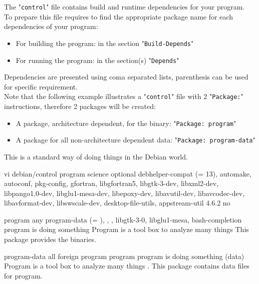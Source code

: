 The "\texttt{control}" file contains build and runtime dependencies for your program. \\
To prepare this file requires to find the appropriate package name for each dependencies of your program: 
\begin{itemize}
\item For building the program: in the section "\texttt{Build-Depends}"
\item For running the program: in the section(s) "\texttt{Depends}" 
\end{itemize}
Dependencies are presented using coma separated lists, parenthesis can be used for specific requirement. \\
Note that the following example illustrates a "\texttt{control}" file with 2 "\texttt{Package:}" instructions, therefore 2 packages will be created:
\begin{itemize}
\item A package, architecture dependent, for the binary: "\texttt{Package: program}"
\item A package for all non-architecture dependent data: "\texttt{Package: program-data}" 
\end{itemize}
This is a standard way of doing things in the Debian world. \\
{\footnotesize{
\begin{script}
 vi debian/control
 program
 science
 optional
 
 
 debhelper-compat (= 13),
                  automake,
                  autoconf,
                  pkg-config,
                  gfortran,
                  libgfortran5,
                  libgtk-3-dev,
                  libxml2-dev,
                  libpango1.0-dev,
                  libglu1-mesa-dev,
                  libepoxy-dev,
                  libavutil-dev,
                  libavcodec-dev,
                  libavformat-dev,
                  libswscale-dev,
                  desktop-file-utils,
                  appstream-util
 4.6.2
 
 \var{\gitprog}
 
 no

 program
 any
	 program-data (= ),
          , ,
          libgtk-3-0,
          libglu1-mesa,
          bash-completion
 program is doing something
 Program is a tool box to analyze many things
 This package provides the binaries.

 program-data
 all
 foreign
 
 program
 program
 program is doing something (data)
 Program is a tool box to analyze many things
 .
 This package contains data files for program.
\end{script}
}}\\[-0.5cm]
